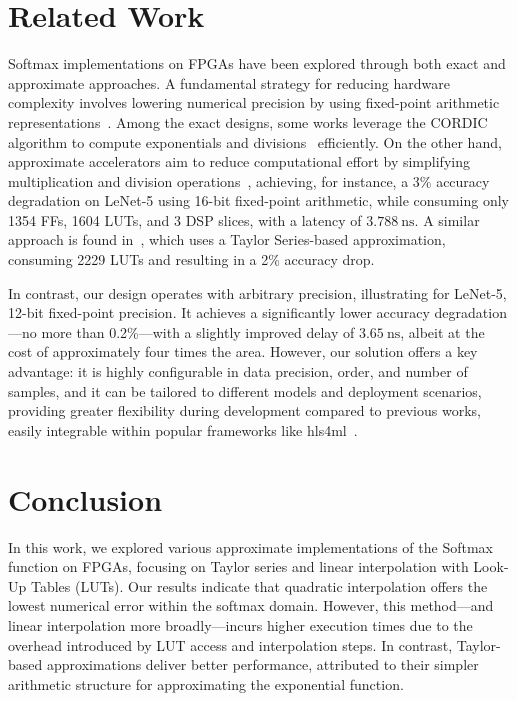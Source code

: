 \documentclass[conference]{IEEEtran}
\begin{document}
\section{Related Work}

Softmax implementations on FPGAs have been explored through both exact and approximate approaches. A fundamental strategy for reducing hardware complexity involves lowering numerical precision by using fixed-point arithmetic representations~\cite{cordic}. Among the exact designs, some works leverage the CORDIC algorithm to compute exponentials and divisions~\cite{cordic, 9531761} efficiently. On the other hand, approximate accelerators aim to reduce computational effort by simplifying multiplication and division operations~\cite{approx-chen}, achieving, for instance, a 3\% accuracy degradation on LeNet-5 using 16-bit fixed-point arithmetic, while consuming only 1354 FFs, 1604 LUTs, and 3 DSP slices, with a latency of $3.788~\text{ns}$. A similar approach is found in~\cite{approx-yao}, which uses a Taylor Series-based approximation, consuming 2229 LUTs and resulting in a 2\% accuracy drop.

In contrast, our design operates with arbitrary precision, illustrating for LeNet-5, 12-bit fixed-point precision. It achieves a significantly lower accuracy degradation—no more than 0.2\%—with a slightly improved delay of $3.65~\text{ns}$, albeit at the cost of approximately four times the area. However, our solution offers a key advantage: it is highly configurable in data precision, order, and number of samples, and it can be tailored to different models and deployment scenarios, providing greater flexibility during development compared to previous works, easily integrable within popular frameworks like hls4ml~\cite{hls4ml}.

\section{Conclusion}
In this work, we explored various approximate implementations of the Softmax function on FPGAs, focusing on Taylor series and linear interpolation with Look-Up Tables (LUTs). Our results indicate that quadratic interpolation offers the lowest numerical error within the softmax domain. However, this method—and linear interpolation more broadly—incurs higher execution times due to the overhead introduced by LUT access and interpolation steps. In contrast, Taylor-based approximations deliver better performance, attributed to their simpler arithmetic structure for approximating the exponential function.
\end{document}
